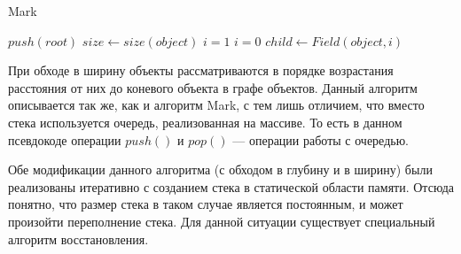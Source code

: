 \begin{algorithm}[p]
\caption{Mark}
\label{BFS}
\begin{algorithmic}[1]
                \EndIf
                \State $push(root)$
                    \State $size \leftarrow size(object)$
                        \State $i = 1$
                    \Else
                        \State $i = 0$
                    \EndIf
                        \State $child \leftarrow Field(object, i)$
                            \EndIf
                        \EndIf
                    \EndFor
                \EndWhile
            \EndIf
        \EndIf
    \EndFor
\end{algorithmic}
\end{algorithm}


При обходе в ширину объекты рассматриваются в порядке возрастания расстояния от них до коневого объекта в графе объектов. Данный алгоритм описывается
так же, как и алгоритм Mark, с тем лишь отличием, что вместо стека используется очередь, реализованная на массиве. То есть в данном псевдокоде операции 
$push()$ и $pop()$ --- операции работы с очередью.

Обе модификации данного алгоритма (с обходом в глубину и в ширину) были реализованы итеративно с созданием стека в статической области памяти. 
Отсюда понятно, что размер стека в таком случае является постоянным, и может произойти переполнение стека. Для данной ситуации существует 
специальный алгоритм восстановления.

